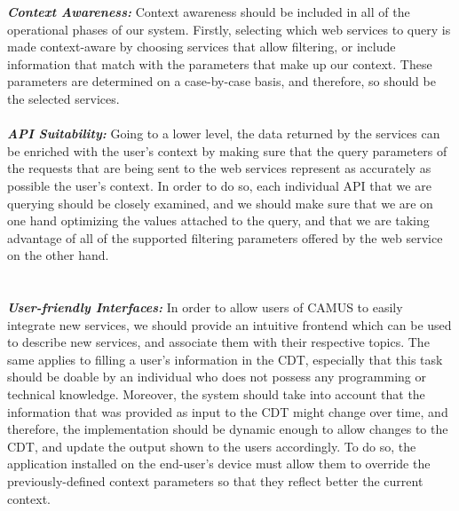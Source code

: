 \textbf{\textit{Context Awareness:}} Context awareness should be included in all of the operational phases of our system. Firstly, selecting which web services to query is made context-aware by choosing services that allow filtering, or include information that match with the parameters that make up our context. These parameters are determined on a case-by-case basis, and therefore, so should be the selected services.\\\\
\textbf{\textit{API Suitability:}} Going to a lower level, the data returned by the services can be enriched with the user's context by making sure that the query parameters of the requests that are being sent to the web services represent as accurately as possible the user's context. In order to do so, each individual API that we are querying should be closely examined, and we should make sure that we are on one hand optimizing the values attached to the query, and that we are taking advantage of all of the supported filtering parameters offered by the web service on the other hand.\\\\\\
\textbf{\textit{User-friendly Interfaces:}} In order to allow users of CAMUS to easily integrate new services, we should provide an intuitive frontend which can be used to describe new services, and associate them with their respective topics. The same applies to filling a user's information in the CDT, especially that this task should be doable by an individual who does not possess any programming or technical knowledge. Moreover, the system should take into account that the information that was provided as input to the CDT might change over time, and therefore, the implementation should be dynamic enough to allow changes to the CDT, and update the output shown to the users accordingly. To do so, the application installed on the end-user's device must allow them to override the previously-defined context parameters so that they reflect better the current context.\\\\
